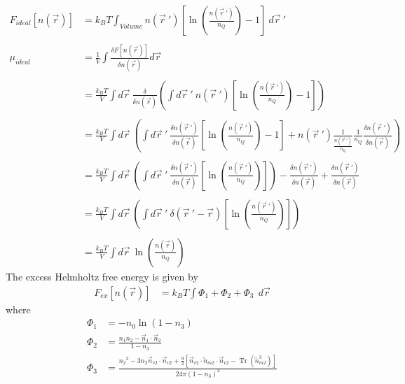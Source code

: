 \documentclass[double,12pt]{revtex4-2}
\begin{document}
\begin{align}
    F_{ideal}[n(\vec{r})] &= k_BT\int_{Volume}n(\vec r~')
      \left[\ln\left(\frac{n(\vec r~')}{n_Q}\right)-1\right] ~d\vec r~' 
      \\ \nonumber \\
%
 \mu_{ideal} &= \frac{1}{V}\int \frac{\delta F[n(\vec r)]}{\delta 
              n(\vec r)} d\vec r \\ \nonumber\\
    &= \frac{k_BT}{V} \int d\vec r ~\frac{\delta}{\delta n(\vec r)}
    \left(\int d\vec r~'~ n(\vec r~')\left[\ln\left(\frac{n(\vec r~')}
    {n_Q}\right)-1\right]\right) \\ \nonumber\\
    &= \frac{k_BT}{V} \int d\vec r ~
    \left(\int d\vec r~'~ \frac{\delta n(\vec r~')}{\delta n(\vec r)}
    \left[\ln\left(\frac{n(\vec r~')}
    {n_Q}\right)-1\right] + n(\vec r~')\frac{1}{\frac{n(\vec r~')}
    {n_Q}}\frac{1}{n_Q} \frac{\delta n(\vec r~')}{\delta n(\vec r)}
    \right)\\ \nonumber\\
    &= \frac{k_BT}{V} \int d\vec r ~
    \left(\int d\vec r~'~ \frac{\delta n(\vec r~')}{\delta n(\vec r)}
    \left[\ln\left(\frac{n(\vec r~')}
    {n_Q}\right)\right]\right) - \frac{\delta n(\vec r~')}{\delta 
    n(\vec r)}+\frac{\delta n(\vec r~')}{\delta n(\vec r)}\\ \nonumber\\
    &= \frac{k_BT}{V} \int d\vec r ~ \left(\int d\vec r~'~\delta(\vec r~'-
    \vec r)\left[\ln\left(\frac{n(\vec r~')}{n_Q}\right)\right]\right) 
    \\ \nonumber\\  
    &= \frac{k_BT}{V} \int d\vec r ~\ln\left(\frac{n(\vec r)}{n_Q}\right)   
\end{align} 
The excess Helmholtz free energy is given by
\begin{align}
    F_{{ex}}[n(\vec r)] &= k_BT\int\Phi_1
    +\Phi_2+\Phi_3~~d\vec r
\end{align}     
where
\begin{align}
    \Phi_1 &= -n_{0}\ln(1-n_{3}) \\
    \Phi_2 &= \frac{n_1n_2-\vec n_1\cdot\vec n_2}{1-n_3} \\
    \Phi_3 &= \frac{{n_2}^3-3n_2\vec n_{v2}\cdot\vec n_{v2}+\frac{9}{2}
       [\vec n_{v2}\cdot{\overleftrightarrow{n}_{m2}}\cdot{\vec n_{v2}}
       -\operatorname{Tr}({\overleftrightarrow n^3_{m2}})]}{24\pi(1-n_3)^2}  
\end{align}
\end{document}
